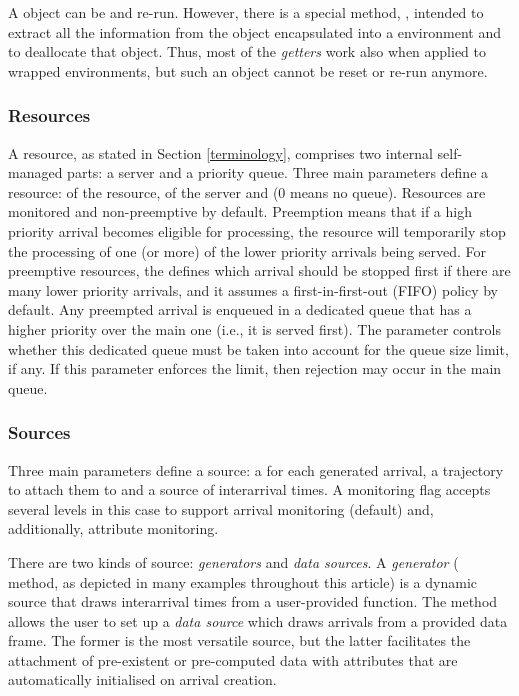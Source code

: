 \documentclass[
  nojss]{jss}
\begin{document}
A  object can be  and re-run. However, there
is a special method, , intended to extract all the
information from the  object encapsulated into a
 environment and to deallocate that object. Thus, most of
the \emph{getters} work also when applied to wrapped environments, but
such an object cannot be reset or re-run anymore.

\subsubsection{Resources}\label{resources}

A  resource, as stated in Section \ref{terminology},
comprises two internal self-managed parts: a server and a priority
queue. Three main parameters define a resource:  of the
resource,  of the server and  (0 means
no queue). Resources are monitored and non-preemptive by default.
Preemption means that if a high priority arrival becomes eligible for
processing, the resource will temporarily stop the processing of one (or
more) of the lower priority arrivals being served. For preemptive
resources, the  defines which arrival should be
stopped first if there are many lower priority arrivals, and it assumes
a first-in-first-out (FIFO) policy by default. Any preempted arrival is
enqueued in a dedicated queue that has a higher priority over the main
one (i.e., it is served first). The  parameter
controls whether this dedicated queue must be taken into account for the
queue size limit, if any. If this parameter enforces the limit, then
rejection may occur in the main queue.

\subsubsection{Sources}\label{sources}

Three main parameters define a source: a  for each
generated arrival, a trajectory to attach them to and a source of
interarrival times. A monitoring flag accepts several levels in this
case to support arrival monitoring (default) and, additionally,
attribute monitoring.

There are two kinds of source: \emph{generators} and \emph{data
sources}. A \emph{generator} ( method, as depicted
in many examples throughout this article) is a dynamic source that draws
interarrival times from a user-provided function. The
 method allows the user to set up a \emph{data
source} which draws arrivals from a provided data frame. The former is
the most versatile source, but the latter facilitates the attachment of
pre-existent or pre-computed data with attributes that are automatically
initialised on arrival creation.
\end{document}

